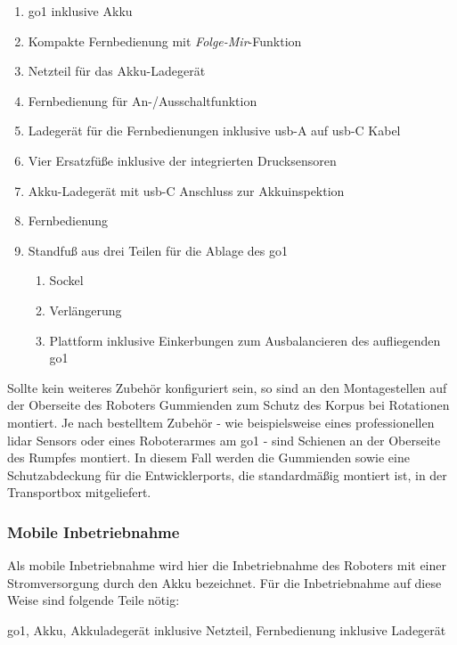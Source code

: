 \begin{enumerate}
    \item \gls{go1} inklusive Akku
    \item Kompakte Fernbedienung mit \emph{Folge-Mir}-Funktion
    \item Netzteil für das Akku-Ladegerät
    \item Fernbedienung für An-/Ausschaltfunktion
    \item Ladegerät für die Fernbedienungen inklusive \gls{usb}-A auf \gls{usb}-C Kabel
    \item Vier Ersatzfüße inklusive der integrierten Drucksensoren
    \item Akku-Ladegerät mit \gls{usb}-C Anschluss zur Akkuinspektion
    \item Fernbedienung
    \item Standfuß aus drei Teilen für die Ablage des \gls{go1}
    \begin{enumerate}
        \item Sockel
        \item Verlängerung
        \item Plattform inklusive Einkerbungen zum Ausbalancieren des aufliegenden \gls{go1}
    \end{enumerate}
\end{enumerate}

Sollte kein weiteres Zubehör konfiguriert sein, so sind an den Montagestellen auf der Oberseite des Roboters Gummienden
zum Schutz des Korpus bei Rotationen montiert.
Je nach bestelltem Zubehör - wie beispielsweise eines professionellen \gls{lidar} Sensors oder eines
Roboterarmes am \gls{go1} - sind Schienen an der Oberseite des Rumpfes montiert.
In diesem Fall werden die Gummienden sowie eine Schutzabdeckung für die Entwicklerports, die standardmäßig montiert ist,
in der Transportbox mitgeliefert.

\subsubsection{Mobile Inbetriebnahme}
\label{subsubsec:inbetriebnahme_akku}

Als mobile Inbetriebnahme wird hier die Inbetriebnahme des Roboters mit einer Stromversorgung durch den Akku bezeichnet.
Für die Inbetriebnahme auf diese Weise sind folgende Teile nötig:

\begin{requirements}
    \gls{go1}, Akku, Akkuladegerät inklusive Netzteil, Fernbedienung inklusive Ladegerät
\end{requirements}

